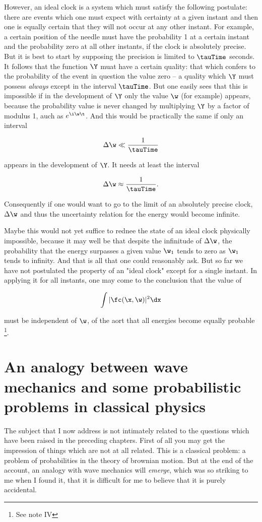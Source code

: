 \documentclass{article}
\newcommand{\uequ}[1]{
\begin{equation*}
#1
\end{equation*}
}
\newcommand{\const}[1]{#1}
\newcommand{\inv}[1]{\frac{1}{#1}}
\renewcommand{\it}[1]{\textit{#1}}
\renewcommand{\exp}[1]{\const{e}^{#1}}
\begin{document}
However, an ideal clock is a system which must satisfy the following postulate: there are events which one must expect with certainty at a given instant and then one is equally certain that they will not occur at any other instant. For example, a certain position of the needle must have the probability 1 at a certain instant and the probability zero at all other instants, if the clock is absolutely precise. But it is best to start by supposing the precision is limited to $\tauTime$ seconds. It follows that the function $\Y$ muat have a certain quality: that which confers to the probability of the event in question the value zero -- a quality which $\Y$ must possess \it{always} except in the interval $\tauTime$. But one easily sees that this is impossible if in the development of $\Y$ only the value $\w$ (for example) appears, because the probability value is never changed by multiplying $\Y$ by a factor of modulus 1, auch as $\exp{\i\w\t}$. And this would be practically the same if only an interval
\uequ{
\Delta\w \ll \inv{\tauTime}
}
appears in the development of $\Y$. It needs at least the interval
\uequ{
\Delta\w \approx \inv{\tauTime}.
}

Consequently if one would want to go to the limit of an absolutely precise clock, $\Delta\w$ and thus the uncertainty relation for the energy would become infinite.

Maybe this would not yet suffice to rednee the state of an ideal clock physically impossible, because it may well be that despite the infinitude of $\Delta\w$, the probability that the energy surpasses a given value $\w_1$ tends to zero as $\w_1$ tends to infinity. And that is all that one could reasonably ask. But so far we have not postulated the property of an "ideal clock" except for a single instant. In applying it for all instants, one may come to the conclusion that the value of
\uequ{
\int|\fc(\x, \w)|^2\dx
}
must be independent of $\w$, of the aort that all energies become equally probable \footnote{See note IV}.

\section{An analogy between wave mechanics and some probabilistic problems in classical physics}

The subject that I now address is not intimately related to the questions which have been raised in the preceding chapters. First of all you may get the impression of things which are not at all related. This is a classical problem: a problem of probabilities in the theory of brownian motion. But at the end of the account, an analogy with wave mechanics will \it{emerge}, which was so striking to me when I found it, that it is difficult for me to believe that it is purely accidental.
\end{document}
